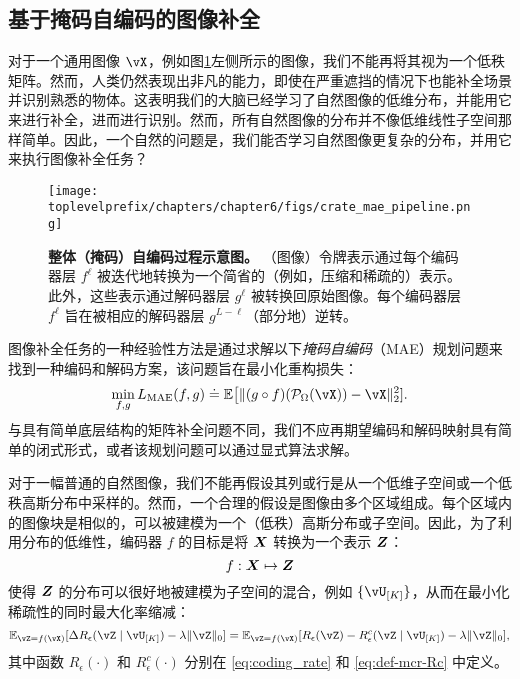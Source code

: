 \documentclass[../../book-main.tex]{subfiles}
\begin{document}
\subsection{基于掩码自编码的图像补全}
对于一个通用图像 $\vX$，例如图\ref{fig:crate_mae_pipeline}左侧所示的图像，我们不能再将其视为一个低秩矩阵。然而，人类仍然表现出非凡的能力，即使在严重遮挡的情况下也能补全场景并识别熟悉的物体。这表明我们的大脑已经学习了自然图像的低维分布，并能用它来进行补全，进而进行识别。然而，所有自然图像的分布并不像低维线性子空间那样简单。因此，一个自然的问题是，我们能否学习自然图像更复杂的分布，并用它来执行图像补全任务？

\begin{figure}[t!]
\begin{center}
  \texttt{[image: \\toplevelprefix/chapters/chapter6/figs/crate\_mae\_pipeline.png]}
\end{center}
\caption{\small \textbf{整体（掩码）自编码过程示意图。} （图像）令牌表示通过每个编码器层 \(f^{\ell}\) 被迭代地转换为一个简省的（例如，压缩和稀疏的）表示。此外，这些表示通过解码器层 \(g^{\ell}\) 被转换回原始图像。每个编码器层 \(f^{\ell}\) 旨在被相应的解码器层 \(g^{L - \ell}\)（部分地）逆转。}
\label{fig:crate_mae_pipeline}
\end{figure}

图像补全任务的一种经验性方法是通过求解以下{\em 掩码自编码}（MAE）规划问题来找到一种编码和解码方案，该问题旨在最小化重构损失：
\begin{equation}\label{eq:mae_loss}
\min_{f, g} L_{\mathrm{MAE}}(f, g) \doteq \mathbb{E}\big[\norm{(g \circ
f)(\mathcal{P}_\Omega(\vX)) - \vX}_{2}^{2}].
\end{equation}
与具有简单底层结构的矩阵补全问题不同，我们不应再期望编码和解码映射具有简单的闭式形式，或者该规划问题可以通过显式算法求解。

对于一幅普通的自然图像，我们不能再假设其列或行是从一个低维子空间或一个低秩高斯分布中采样的。然而，一个合理的假设是图像由多个区域组成。每个区域内的图像块是相似的，可以被建模为一个（低秩）高斯分布或子空间。因此，为了利用分布的低维性，编码器 $f$ 的目标是将 $\bm{X}$ 转换为一个表示 $\bm{Z}$：
\begin{equation}
    f: \bm{X} \mapsto \bm{Z}
\end{equation}
使得 $\bm{Z}$ 的分布可以很好地被建模为子空间的混合，例如 $\{\vU_{[K]}\}$，从而在最小化稀疏性的同时最大化率缩减：
\begin{equation}\label{eq:sparse_rr}
\mathbb{E}_{\vZ = f(\vX)}[\Delta R_{\epsilon}(\vZ \mid \vU_{[K]}) - \lambda
\norm{\vZ}_{0}] = \mathbb{E}_{\vZ = f(\vX)}[R_\epsilon(\vZ) - R^{c}_\epsilon(\vZ \mid
\vU_{[K]}) - \lambda \norm{\vZ}_{0}],
\end{equation}
其中函数 $R_\epsilon(\cdot)$ 和 $R^c_\epsilon(\cdot)$ 分别在 \eqref{eq:coding_rate} 和 \eqref{eq:def-mcr-Rc} 中定义。
\end{document}
